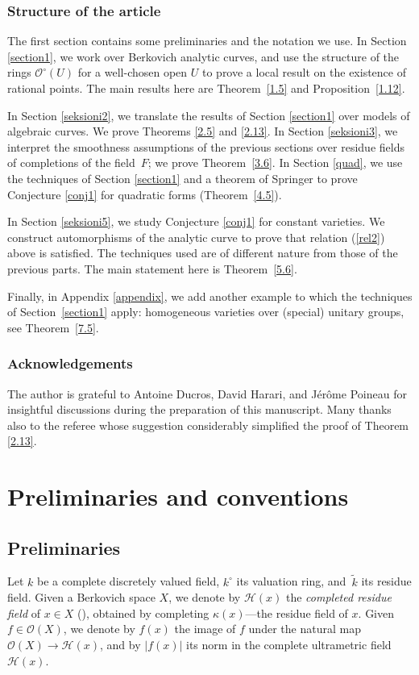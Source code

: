\documentclass[JEP,XML,SOM,Unicode,NoFloatCountersInSection,published]{cedram}
\theoremstyle{definition}
\begin{document}
\subsubsection*{Structure of the article}
The first section contains some preliminaries and the notation we use. In Section \ref{section1}, we work over Berkovich analytic curves, and use the structure of the rings $\mathcal{O}^{\circ}(U)$ for a well-chosen open $U$ to prove a local result on the existence of rational points. The main results here are Theorem~\ref{1.5} and Proposition~\ref{1.12}.

In Section \ref{seksioni2}, we translate the results of Section \ref{section1} over models of algebraic curves. We prove Theorems \ref{2.5} and \ref{2.13}. In Section \ref{seksioni3}, we interpret the smoothness assumptions of the previous sections over residue fields of completions of the field~$F$; we prove Theorem~\ref{3.6}.
In Section \ref{quad}, we use the techniques of Section \ref{section1} and a theorem of Springer to prove Conjecture \ref{conj1} for quadratic forms (Theorem~\ref{4.5}).

In Section \ref{seksioni5}, we study Conjecture \ref{conj1} for constant varieties. We construct automorphisms of the analytic curve to prove that relation (\ref{rel2}) above is satisfied. The techniques used are of different nature from those of the previous parts. The main statement here is Theorem~\ref{5.6}.

Finally, in Appendix \ref{appendix}, we add another example to which the techniques of Section~\ref{section1} apply: homogeneous varieties over (special) unitary groups, see Theorem~\ref{7.5}.\enlargethispage{.5\baselineskip}%

\subsubsection*{Acknowledgements}
The author is grateful to Antoine Ducros, David Harari, and Jérôme Poineau for insightful discussions during the preparation of this manuscript. Many thanks also to the referee whose suggestion considerably simplified the proof of Theorem \ref{2.13}.

\section{Preliminaries and conventions}

\subsection{Preliminaries}
Let $k$ be a complete discretely valued field, $k^{\circ}$ its valuation ring, and~$\widetilde{k}$ its residue field. Given a Berkovich space $X$, we denote by $\mathcal{H}(x)$ the \emph{completed residue field} of $x \in X$ (\cf \cite[Rem.\,1.2.2]{Ber90}), obtained by completing $\kappa(x)$---the residue field of $x$. Given $f \in \mathcal{O}(X)$, we denote by $f(x)$ the image of $f$ under the natural map $\mathcal{O}(X) \to \mathcal{H}(x)$, and by $|f(x)|$ its norm in the complete ultrametric field~$\mathcal{H}(x)$.
\end{document}
